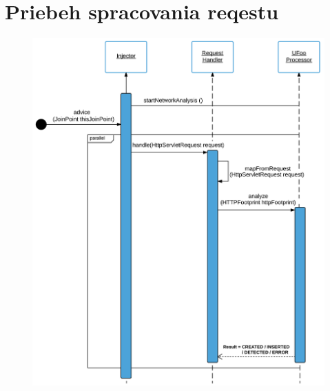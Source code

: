 \documentclass[
  digital, %
  table,   %
  lof,     %
  nolot,   %
  nocover
]{fithesis3}
\begin{document}
\chapter{Priebeh spracovania reqestu}
\label{fig:appendix-impl-flow}
\begin{figure}[H]
  \centering
    \includegraphics[width=1\textwidth]{images/footprint-impl-flow-1.png}
\end{figure}
\end{document}
